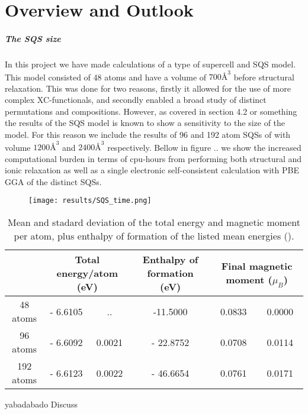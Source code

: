 \chapter{Overview and Outlook}
\label{sec:final}

\paragraph{The SQS size \\}
In this project we have made calculations of a type of supercell and SQS model. This model consisted of 48 atoms and have a volume of $700 Å^3$ before structural relaxation. This was done for two reasons, firstly it allowed for the use of more complex XC-functionals, and secondly enabled a broad study of distinct permutations and compositions. However, as covered in section 4.2 or something the results of the SQS model is known to show a sensitivity to the size of the model. For this reason we include the results of 96 and 192 atom SQSs of  with volume $1200 Å^3$ and $2400 Å^3$ respectively. Bellow in figure .. we show the increased computational burden in terms of cpu-hours from performing both structural and ionic relaxation as well as a single electronic self-consistent calculation with PBE GGA of the distinct SQSs. 

\begin{figure}[H]
\centering
\texttt{[image: results/SQS\_time.png]}
\end{figure}

\begin{table}[h!]
\hskip-2cm\begin{tabular}{@{}cccccc@{}}
\toprule
       & \multicolumn{2}{c}{Total energy/atom (eV)} & Enthalpy of formation (eV) & \multicolumn{2}{c}{Final magnetic moment ($\mu_B$)} \\ \midrule
48 atoms & - 6.6105 & .. & -11.5000 & 0.0833 & 0.0000    \\
96 atoms & - 6.6092  & 0.0021 & - 22.8752  & 0.0708  & 0.0114     \\
192 atoms & - 6.6123  & 0.0022 & - 46.6654 & 0.0761 & 0.0171     \\ \bottomrule
\end{tabular}
\caption{Mean and stadard deviation of the total energy and magnetic moment per atom, plus enthalpy of formation of the listed mean energies ().}
\end{table}


yabadabado Discuss \\

